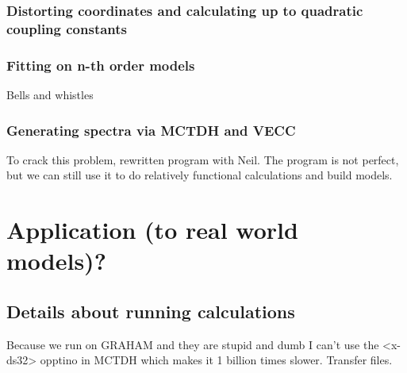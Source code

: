 \documentclass[letterpaper, 12pt, oneside]{report}
\newif\iffinalize
\newif\iffinalize
\begin{document}
\subsection{Distorting coordinates and calculating up to quadratic coupling constants}

\subsection{Fitting on n-th order models}
Bells and whistles

\subsection{Generating spectra via MCTDH and VECC}
To crack this problem, rewritten program with Neil. The program is not perfect, but we can still use it to do relatively functional calculations and build models.

\newpage
\else \fi


\iffinalize
\chapter{Application (to real world models)?}


\section{Details about running calculations}
Because we run on GRAHAM and they are stupid and dumb I can't use the <x-ds32> opptino in MCTDH which makes it 1 billion times slower.
Transfer files.


\end{document}
